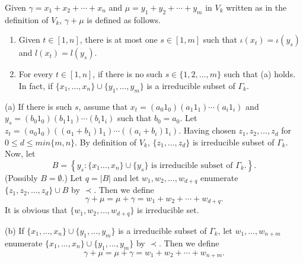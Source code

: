 \documentclass[twoside,11pt]{article}
\begin{document}
\begin{definition}{\label{3.366}}
	Given \( \gamma = x_1 + x_2 + \cdots + x_n \) and \( \mu = y_1 + y_2 + \cdots + y_m \) in \( V_k \) written as in the definition of \( V_k \), \( \gamma + \mu \) is defined as follows.
	\begin{enumerate}
		
		\item[(a)] 	Given \( t \in [1,n] \), there is at most one \( s \in [1,m] \) such that \( \iota(x_t) = \iota(y_s) \) and \( l(x_t) = l(y_s) \). 
		
		\item[(b)] For every \( t \in [1,n] \), if there is no such \( s \in \{1, 2, \ldots, m\} \) such that (a) holds. In fact, if  $\{x_1,\ldots,x_n\}\cup\{y_1,\ldots,y_m\}$ is a irreducible subset of $\Gamma_k$.
	\end{enumerate}
	(a) If there is such \( s \), assume that $x_t = (a_0 1_0)(a_1 1_1) \cdots (a_i 1_i)$ and $ y_s = (b_0 1_0)(b_1 1_1) \cdots (b_i 1_i)$ such that \( b_0 = a_0 \). Let $z_t = (a_0 1_0)((a_1 + b_1) 1_1) \cdots ((a_i + b_i) 1_i)$. Having chosen \( z_1, z_2, \ldots, z_d \) for $0\leq d\leq min\{m,n\}$. By definition of $V_k$, $\{z_1,\ldots,z_d\}$ is irreducible subset of $\Gamma_k$. Now, let
	\[
	B = \left\{ y_s :\{x_1\ldots,x_n\}\cup\{y_s\}\text{ is irreducible subset of }\Gamma_k. \right\}.
	\]
	(Possibly \( B = \emptyset \).) 	Let \( q = |B| \) and let \( w_1, w_2, \ldots, w_{d+q} \) enumerate \linebreak \( \{z_1, z_2, \ldots, z_d\} \cup B \) by $\prec$. Then we define
	\[
	\gamma + \mu = \mu + \gamma = w_1 + w_2 + \cdots + w_{d+q}.
	\]
	It is obvious that $\{w_1,w_2,\ldots,w_{d+q}\}$ is irreducible set.
	
	(b) If $\{x_1,\ldots,x_n\}\cup\{y_1,\ldots,y_m\}$ is a irreducible subset of $\Gamma_k$, let $w_1,\ldots,w_{n+m}$ enumerate $\{x_1,\ldots,x_n\}\cup\{y_1,\ldots,y_m\}$ by $\prec$. Then we define 
	\[
	\gamma+\mu=\mu+\gamma=w_1+w_2+\cdots+w_{n+m}.
	\]
\end{definition}
\end{document}
